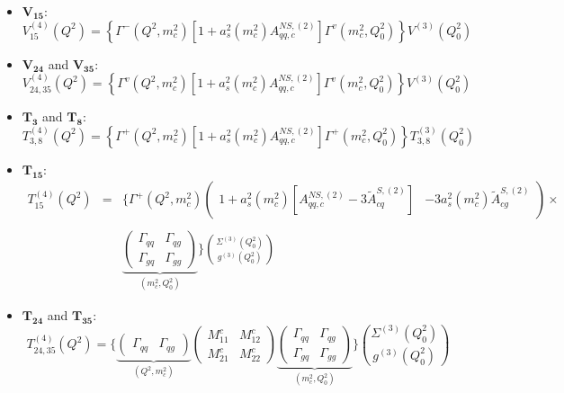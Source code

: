 \documentclass[10pt,a4paper]{article}
\begin{document}
\begin{itemize}
\begin{equation}
\end{equation}
\item $\mathbf{V_{15}}$:
\begin{equation}
V_{15}^{(4)}(Q^2)=\left\{\Gamma^{-}(Q^2,m_c^2)[1+a_s^2(m_c^2)A_{qq,c}^{N\!S,(2)}]\Gamma^{v}(m_c^2,Q_0^2)\right\}V^{(3)}(Q_0^2)
\end{equation}
\item $\mathbf{V_{24}}$ and $\mathbf{V_{35}}$:
\begin{equation}
V_{24,35}^{(4)}(Q^2)=\left\{\Gamma^{v}(Q^2,m_c^2)[1+a_s^2(m_c^2)A_{qq,c}^{N\!S,(2)}]\Gamma^{v}(m_c^2,Q_0^2)\right\}V^{(3)}(Q_0^2)
\end{equation}
\item $\mathbf{T_3}$ and $\mathbf{T_8}$:
\begin{equation}
T^{(4)}_{3,8}(Q^2)=\left\{\Gamma^{+}(Q^2,m_c^2)[1+a_s^2(m_c^2)A_{qq,c}^{N\!S,(2)}]\Gamma^{+}(m_c^2,Q_0^2)\right\}T^{(3)}_{3,8}(Q^2_0)
\end{equation}
\item $\mathbf{T_{15}}$:
\begin{equation}
\begin{array}{rcl}
\displaystyle T_{15}^{(4)}(Q^2)&=&\Bigg\{\Gamma^{+}(Q^2,m_c^2)\begin{pmatrix} 1+a_s^2(m_c^2)[A_{qq,c}^{N\!S,(2)}-3\tilde{A}^{S,(2)}_{cq}] & -3a_s^2(m_c^2)\tilde{A}^{S,(2)}_{cg}\end{pmatrix}\times\\
\\
 & & \displaystyle \underbrace{\begin{pmatrix}\Gamma_{qq}& \Gamma_{qg} \\ \Gamma_{gq} & \Gamma_{gg}\end{pmatrix}}_{(m_c^2,Q_0^2)}\Bigg\}{\Sigma^{(3)}(Q_0^2) \choose g^{(3)}(Q_0^2)}
\end{array}
\end{equation} 
\item $\mathbf{T_{24}}$ and $\mathbf{T_{35}}$:
\begin{equation}
T_{24,35}^{(4)}(Q^2) = \Bigg\{\underbrace{\begin{pmatrix} \Gamma_{qq} & \Gamma_{qg}\end{pmatrix}}_{(Q^2,m_c^2)}\begin{pmatrix} M_{11}^c & M_{12}^c \\ M_{21}^c & M_{22}^c\end{pmatrix}\underbrace{\begin{pmatrix} \Gamma_{qq}& \Gamma_{qg} \\ \Gamma_{gq}& \Gamma_{gg}\end{pmatrix}}_{(m_c^2,Q_0^2)}\Bigg\}{\Sigma^{(3)}(Q_0^2) \choose g^{(3)}(Q_0^2)}
\end{equation}
\end{itemize}
\end{document}
